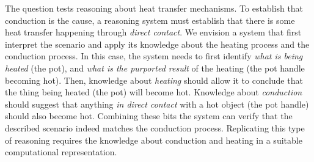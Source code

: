 

The question tests reasoning about heat transfer mechanisms.
To establish that conduction is the cause, a reasoning system must establish that there is some heat transfer happening through {\em direct contact}. 
We envision a system that first interpret the scenario and apply its knowledge about the heating process and the conduction process. 
In this case, the system needs to first identify {\em what is being heated} (the pot), and {\em what is the purported result} of the heating (the pot handle becoming hot). 
Then, knowledge about {\em heating} should allow it to conclude that the thing being heated (the pot) will become hot. 
Knowledge about {\em conduction} should suggest that anything {\em in direct contact} with a hot object (the pot handle) should also become hot.
Combining these bits the system can verify that the described scenario indeed matches the conduction process.
Replicating this type of reasoning requires the knowledge about conduction and heating in a suitable computational representation.


